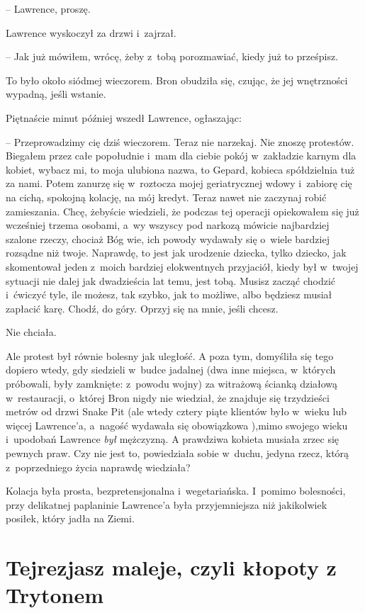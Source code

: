 \documentclass[oneside,polish,11pt,rmheadings]{mwbk}
\begin{document}
-- Lawrence, proszę. 

Lawrence wyskoczył za drzwi i~zajrzał. 

-- Jak już mówiłem, wrócę, żeby z~tobą porozmawiać, kiedy już to prześpisz. 

To było około siódmej wieczorem. Bron obudziła się, czując, że jej wnętrzności wypadną, jeśli wstanie. 

Piętnaście minut później wszedł Lawrence, ogłaszając: 

-- Przeprowadzimy cię dziś wieczorem. Teraz nie narzekaj. Nie znoszę protestów. Biegałem przez całe popołudnie i~mam dla ciebie pokój w~zakładzie karnym dla kobiet, wybacz mi, to moja ulubiona nazwa, to Gepard, kobieca spółdzielnia tuż za nami. Potem zanurzę się w~roztocza mojej geriatrycznej wdowy i~zabiorę cię na cichą, spokojną kolację, na mój kredyt. Teraz nawet nie zaczynaj robić zamieszania. Chcę, żebyście wiedzieli, że podczas tej operacji opiekowałem się już wcześniej trzema osobami, a~wy wszyscy pod narkozą mówicie najbardziej szalone rzeczy, chociaż Bóg wie, ich powody wydawały się o~wiele bardziej rozsądne niż twoje. Naprawdę, to jest jak urodzenie dziecka, tylko dziecko, jak skomentował jeden z~moich bardziej elokwentnych przyjaciół, kiedy był w~twojej sytuacji nie dalej jak dwadzieścia lat temu, jest tobą. Musisz zacząć chodzić i~ćwiczyć tyle, ile możesz, tak szybko, jak to możliwe, albo będziesz musiał zapłacić karę. Chodź, do góry. Oprzyj się na mnie, jeśli chcesz. 

Nie chciała. 

Ale protest był równie bolesny jak uległość. A poza tym, domyśliła się tego dopiero wtedy, gdy siedzieli w~budce jadalnej (dwa inne miejsca, w~których próbowali, były zamknięte: z~powodu wojny) za witrażową ścianką działową w~restauracji, o~której Bron nigdy nie wiedział, że znajduje się trzydzieści metrów od drzwi Snake Pit (ale wtedy cztery piąte klientów było w~wieku lub więcej Lawrence'a, a~nagość wydawała się obowiązkowa ),mimo swojego wieku i~upodobań Lawrence \textit{był }mężczyzną. A prawdziwa kobieta musiała zrzec się pewnych praw.  Czy nie jest to, powiedziała sobie w~duchu, jedyna rzecz, którą z~poprzedniego życia naprawdę wiedziała? 

Kolacja była prosta, bezpretensjonalna i~wegetariańska. I~pomimo bolesności, przy delikatnej paplaninie Lawrence'a była przyjemniejsza niż jakikolwiek posiłek, który jadła na Ziemi. 

\chapter{Tejrezjasz maleje, czyli kłopoty z Trytonem}
\end{document}

